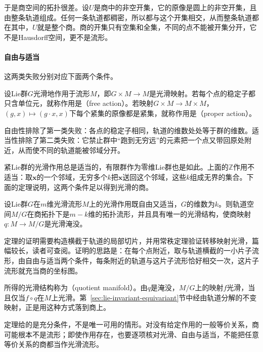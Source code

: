 于是商空间的拓扑很差。设$U$是商中的非空开集，它的原像是圆上的非空开集，且由整条轨道组成。任何一条轨道都稠密，所以都与这个开集相交，从而整条轨道都在其中，$U$就是整个商。商的开集只有空集和全集，不同的点不能被开集分开，它不是Hausdorff空间，更不是流形。

\paragraph{自由与适当}
这两类失败分别对应下面两个条件。

\begin{definition}[自由作用与适当作用]
\label{def:lie-free-proper-action}
设Lie群$G$光滑地作用于流形$M$，即$G\times M\to M$是光滑映射。若每个点的稳定子都只含单位元，就称作用是（free action）。若映射$G\times M\to M\times M$，$(g,x)\mapsto(g\cdot x,x)$下每个紧集的原像都是紧集，就称作用是（proper action）。
\end{definition}

自由性排除了第一类失败：各点的稳定子相同，轨道的维数处处等于群的维数。适当性排除了第二类失败：它禁止群中“跑到无穷远”的元素把一个点又带回原处附近，从而使不同的轨道能被邻域分开。

紧Lie群的光滑作用总是适当的，有限群作为零维Lie群也是如此。上面的$\mathbb Z$作用不适当：取$\bm x$的一个邻域，无穷多个$k$把$\bm x$送回这个邻域，这些$k$组成无界的集合。下面的定理说明，这两个条件足以得到光滑的商。

\begin{theorem}[商流形定理]
\label{thm:lie-quotient-manifold}
设Lie群$G$在$m$维光滑流形$M$上的光滑作用既自由又适当，$G$的维数为$k$。则轨道空间$M/G$在商拓扑下是$m-k$维的拓扑流形，并且具有唯一的光滑结构，使商映射$q:M\to M/G$是光滑淹没。
\end{theorem}

定理的证明需要构造横截于轨道的局部切片，并用常秩定理验证转移映射光滑，篇幅较长，读者可查阅。证明的思路是：在每个点附近，取与轨道横截的一小片子流形，由自由与适当两个条件，每条附近的轨道与这片子流形恰好相交一次，这片子流形就充当商的坐标图。

所得的光滑结构称为（quotient manifold）。由$q$是淹没，$M/G$上的映射$f$光滑，当且仅当$f\circ q$在$M$上光滑。第~\ref{sec:lie-invariant-equivariant}节中经由轨道分解的不变映射，正是用这种方式落到商上。

定理给的是充分条件，不是唯一可用的情形。对没有给定作用的一般等价关系，商可能根本不是流形；即使作用存在，也要逐项核对光滑、自由与适当，不能把任意等价关系的商都当作光滑流形。

